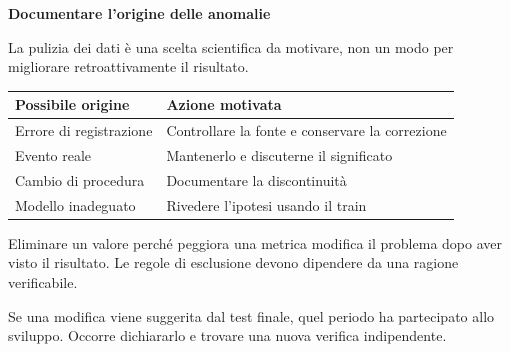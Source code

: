 \documentclass[12pt,aspectratio=1610]{beamer}
\newcommand{\PBody}[1]{\par{\fontsize{11.3}{14.8}\selectfont #1\par}}
\newcommand{\PSmall}[1]{\par{\fontsize{9.8}{13.1}\selectfont #1\par}}
\newcommand{\PInfo}[1]{%
\begin{tcolorbox}[enhanced,arc=1.6mm,boxrule=.55pt,colback=GeoTint,
 colframe=Rule!80!Classical,left=2.3mm,right=2.3mm,top=2mm,bottom=2mm,
 before skip=1mm,after skip=1mm]
\PSmall{#1}\end{tcolorbox}}
\begin{document}
\begin{frame}[plain]\hypertarget{slide68}{}
\begin{lrbox}{\TitleBox}
\begin{minipage}[t]{17.7cm}\raggedright\color{Ink}\fontsize{11.3}{14.8}\selectfont
\color{Navy}\bfseries\fontsize{20.6}{24.5}\selectfont Documentare l’origine delle anomalie
\end{minipage}\end{lrbox}

\begin{lrbox}{\RecallBox}
\begin{minipage}[t]{14.3cm}\raggedright\color{Ink}\fontsize{11.3}{14.8}\selectfont
\fontsize{10.3}{13.8}\selectfont La pulizia dei dati è una scelta scientifica da motivare, non un modo per migliorare retroattivamente il risultato.
\end{minipage}\end{lrbox}

\begin{lrbox}{\PilotLeftBox}
\begin{minipage}[t]{10.05cm}\raggedright\color{Ink}\fontsize{11.3}{14.8}\selectfont
{\fontsize{10.2}{13.1}\selectfont\renewcommand{\arraystretch}{1.45}\begin{tabular}{@{}p{3.4cm}p{5.7cm}@{}}\toprule
\textbf{Possibile origine} & \textbf{Azione motivata}\\\midrule
Errore di registrazione & Controllare la fonte e conservare la correzione\\
Evento reale & Mantenerlo e discuterne il significato\\
Cambio di procedura & Documentare la discontinuità\\
Modello inadeguato & Rivedere l’ipotesi usando il train\\
\bottomrule\end{tabular}}

\end{minipage}\end{lrbox}

\begin{lrbox}{\PilotRightBox}
\begin{minipage}[t]{7.55cm}\raggedright\color{Ink}\fontsize{11.3}{14.8}\selectfont
\PBody{Eliminare un valore perché peggiora una metrica modifica il problema dopo aver visto il risultato. Le regole di esclusione devono dipendere da una ragione verificabile.}
\vspace{2.5mm}
\PInfo{Se una modifica viene suggerita dal test finale, quel periodo ha partecipato allo sviluppo. Occorre dichiararlo e trovare una nuova verifica indipendente.}


\end{minipage}
\end{lrbox}
\end{frame}
\end{document}
